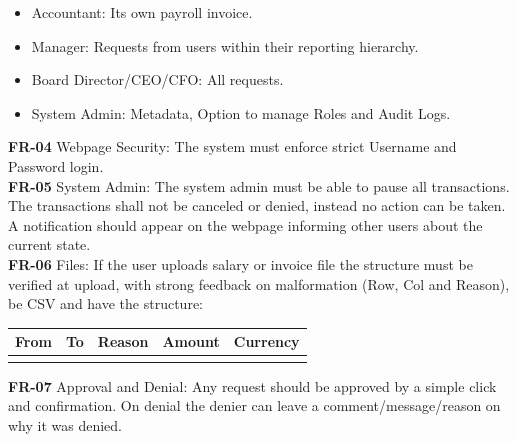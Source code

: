 \documentclass[11pt,a4paper]{article}
\begin{document}
\begin{itemize}
\item
  Accountant: Its own payroll invoice.
\item
  Manager: Requests from users within their reporting hierarchy.
\item
  Board Director/CEO/CFO: All requests.
\item
  System Admin: Metadata, Option to manage Roles and Audit Logs.
\end{itemize}

\noindent\textbf{FR-04} Webpage Security: The system must enforce strict Username
and Password login. \\
\textbf{FR-05} System Admin: The system admin must be able to pause all
transactions. The transactions shall not be canceled or denied, instead
no action can be taken. A notification should appear on the webpage
informing other users about the current state. \\
\textbf{FR-06} Files: If the user uploads salary or invoice file the
structure must be verified at upload, with strong feedback on
malformation (Row, Col and Reason), be CSV and have the structure:

\begin{longtable}[]{@{}
  >{\raggedright\arraybackslash}p{}
  >{\raggedright\arraybackslash}p{}
  >{\raggedright\arraybackslash}p{}
  >{\raggedright\arraybackslash}p{}
  >{\raggedright\arraybackslash}p{}@{}}
\toprule\noalign{}
\begin{minipage}[b]{\linewidth}\raggedright
From
\end{minipage} & \begin{minipage}[b]{\linewidth}\raggedright
To
\end{minipage} & \begin{minipage}[b]{\linewidth}\raggedright
Reason
\end{minipage} & \begin{minipage}[b]{\linewidth}\raggedright
Amount
\end{minipage} & \begin{minipage}[b]{\linewidth}\raggedright
Currency
\end{minipage} \\
\midrule\noalign{}
\endhead
\end{longtable}
\noindent\textbf{FR-07} Approval and Denial: Any request should be approved by a
simple click and confirmation. On denial the denier can leave a
comment/message/reason on why it was denied.
\end{document}
